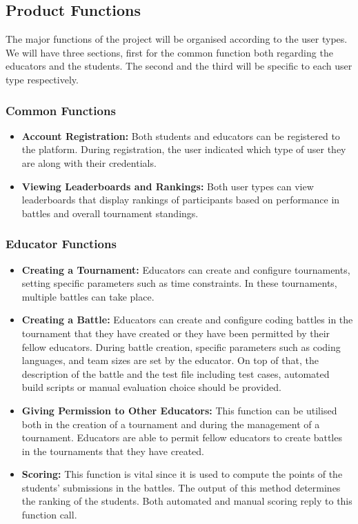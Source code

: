 \subsection{Product Functions}

The major functions of the project will be organised according to the user types. We will have three sections, first for the common function both regarding the educators and the students. The second and the third will be specific to each user type respectively.

\subsubsection{Common Functions}

\begin{itemize}
    \item \textbf{Account Registration:} Both students and educators can be registered to the platform. During registration, the user indicated which type of user they are along with their credentials.

    \item \textbf{Viewing Leaderboards and Rankings:} Both user types can view leaderboards that display rankings of participants based on performance in battles and overall tournament standings.
\end{itemize}

\subsubsection{Educator Functions}
\begin{itemize}
    \item \textbf{Creating a Tournament:} Educators can create and configure tournaments, setting specific parameters such as time constraints. In these tournaments, multiple battles can take place.

    \item \textbf{Creating a Battle:} Educators can create and configure coding battles in the tournament that they have created or they have been permitted by their fellow educators. During battle creation, specific parameters such as coding languages, and team sizes are set by the educator. On top of that, the description of the battle and the test file including test cases, automated build scripts or manual evaluation choice should be provided.

    \item \textbf{Giving Permission to Other Educators:} This function can be utilised both in the creation of a tournament and during the management of a tournament. Educators are able to permit fellow educators to create battles in the tournaments that they have created.

    \item \textbf{Scoring:} This function is vital since it is used to compute the points of the students' submissions in the battles. The output of this method determines the ranking of the students. Both automated and manual scoring reply to this function call.
    
\end{itemize}

